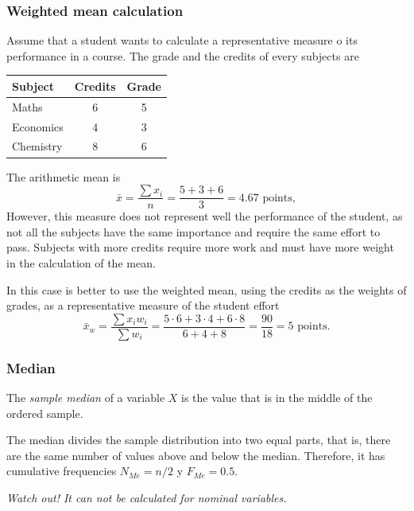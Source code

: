 \begin{frame}
\frametitle{Weighted mean calculation}
Assume that a student wants to calculate a representative measure o its performance in a course. 
The grade and the credits of every subjects are 
\begin{center}
\footnotesize
\begin{tabular}{lcc}
\hline
Subject & Credits & Grade\\
\hline
Maths & 6 & 5 \\
Economics & 4 & 3 \\
Chemistry & 8 & 6 \\
\hline
\end{tabular}
\end{center}
The arithmetic mean is 
\[
\bar{x} = \frac{\sum x_i}{n} = \frac{5+3+6}{3}= 4.67 \text{ points},
\]
However, this measure does not represent well the performance of the student, as not all the subjects have the same
importance and require the same effort to pass. 
Subjects with more credits require more work and must have more weight in the calculation of the mean. 

In this case is better to use the weighted mean, using the credits as the
weights of grades, as a representative measure of the student effort
\[
\bar{x}_w = \frac{\sum x_iw_i}{\sum w_i} = \frac{5\cdot 6+3\cdot 4+6\cdot 8}{6+4+8}= \frac{90}{18} = 5 \text{ points}.
\]
\end{frame}


\begin{frame}
\frametitle{Median}
\begin{definition}
The \emph{sample median} of a variable $X$ is the value that is in the middle of the ordered sample. 
\end{definition}

The median divides the sample distribution into two equal parts, that is, there are the same number of values above and
below the median. Therefore, it has cumulative frequencies $N_{Me}= n/2$ y  $F_{Me}= 0.5$.

\begin{center}
\alert{\emph{Watch out! It can not be calculated for nominal variables.}}
\end{center}

\end{frame}



